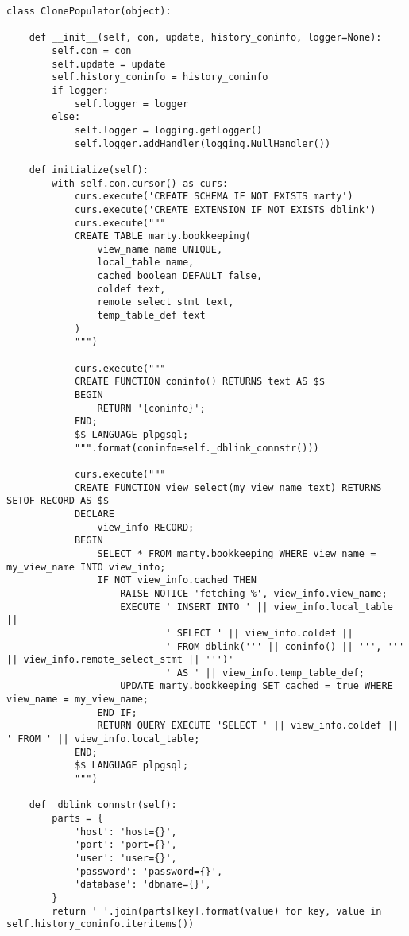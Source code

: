 \begin{lstlisting}[caption={utils/populator.py}]
class ClonePopulator(object):

    def __init__(self, con, update, history_coninfo, logger=None):
        self.con = con
        self.update = update
        self.history_coninfo = history_coninfo
        if logger:
            self.logger = logger
        else:
            self.logger = logging.getLogger()
            self.logger.addHandler(logging.NullHandler())

    def initialize(self):
        with self.con.cursor() as curs:
            curs.execute('CREATE SCHEMA IF NOT EXISTS marty')
            curs.execute('CREATE EXTENSION IF NOT EXISTS dblink')
            curs.execute("""
            CREATE TABLE marty.bookkeeping(
                view_name name UNIQUE,
                local_table name,
                cached boolean DEFAULT false,
                coldef text,
                remote_select_stmt text,
                temp_table_def text
            )
            """)

            curs.execute("""
            CREATE FUNCTION coninfo() RETURNS text AS $$
            BEGIN
                RETURN '{coninfo}';
            END;
            $$ LANGUAGE plpgsql;
            """.format(coninfo=self._dblink_connstr()))

            curs.execute("""
            CREATE FUNCTION view_select(my_view_name text) RETURNS SETOF RECORD AS $$
            DECLARE
                view_info RECORD;
            BEGIN
                SELECT * FROM marty.bookkeeping WHERE view_name = my_view_name INTO view_info;
                IF NOT view_info.cached THEN
                    RAISE NOTICE 'fetching %', view_info.view_name;
                    EXECUTE ' INSERT INTO ' || view_info.local_table ||
                            ' SELECT ' || view_info.coldef ||
                            ' FROM dblink(''' || coninfo() || ''', ''' || view_info.remote_select_stmt || ''')'
                            ' AS ' || view_info.temp_table_def;
                    UPDATE marty.bookkeeping SET cached = true WHERE view_name = my_view_name;
                END IF;
                RETURN QUERY EXECUTE 'SELECT ' || view_info.coldef || ' FROM ' || view_info.local_table;
            END;
            $$ LANGUAGE plpgsql;
            """)

    def _dblink_connstr(self):
        parts = {
            'host': 'host={}',
            'port': 'port={}',
            'user': 'user={}',
            'password': 'password={}',
            'database': 'dbname={}',
        }
        return ' '.join(parts[key].format(value) for key, value in self.history_coninfo.iteritems())


\end{lstlisting}
